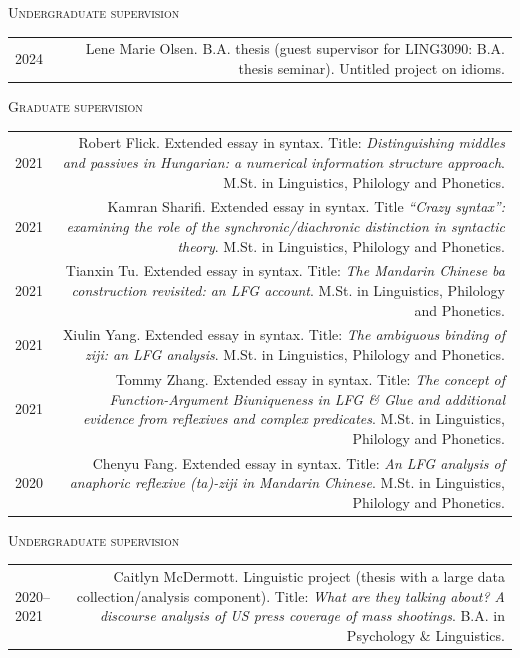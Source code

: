 \documentclass[11pt,a4paper]{article}
\makeatletter
\newlength{\rulelength}%
\newenvironment{cvsection}{%
  \setlength{\extrarowheight}{0.70ex}
  \begin{longtable}[l]{@{} L R @{}}
}{%
  \end{longtable}
}
\newcommand{\cvsubhead}[1]{\noindent\hspace*{\rulelength}\hspace*{9pt} \textsc{#1}\vspace*{0.25\baselineskip}}
\newcommand{\rulesubhead}[1]{\noindent{\color{headercolor}\rule[0.4ex]{\rulelength}{1pt}\hspace*{9pt} {#1}}\vspace*{0.25\baselineskip}}
\makeatother
\begin{document}
\cvsubhead{Undergraduate supervision}

\begin{cvsection}
  2024 & Lene Marie Olsen. B.A. thesis (guest supervisor for LING3090: B.A. thesis seminar). Untitled project on idioms.%
\end{cvsection}

\rulesubhead{University of Oxford}

\cvsubhead{Graduate supervision}

\begin{cvsection}
  2021 & Robert Flick. Extended essay in syntax. Title: \textit{Distinguishing
    middles and passives in Hungarian: a numerical information structure
    approach}. M.St. in Linguistics, Philology and Phonetics. \\

  2021 & Kamran Sharifi. Extended essay in syntax. Title \textit{``Crazy
    syntax'': examining the role of the synchronic/diachronic distinction in
    syntactic theory}. M.St. in Linguistics, Philology and Phonetics.\\

  2021 & Tianxin Tu. Extended essay in syntax. Title: \textit{The Mandarin
    Chinese \emph{ba} construction revisited: an LFG account}. M.St. in Linguistics, Philology and Phonetics.\\

  2021 & Xiulin Yang. Extended essay in syntax. Title: \textit{The ambiguous
    binding of \emph{ziji}: an LFG analysis}. M.St. in Linguistics, Philology and Phonetics.\\

  2021 & Tommy Zhang. Extended essay in syntax. Title: \textit{The concept of
    Function-Argument Biuniqueness in LFG \& Glue and additional evidence
    from reflexives and complex predicates}. M.St. in Linguistics, Philology and Phonetics.\\

  2020 & Chenyu Fang. Extended essay in syntax. Title: \textit{An LFG analysis
    of anaphoric reflexive \emph{(ta)-ziji} in Mandarin Chinese}. M.St. in
  Linguistics, Philology and Phonetics.
\end{cvsection}

\newpage
\cvsubhead{Undergraduate supervision}

\begin{cvsection}
  2020--2021 & Caitlyn McDermott. Linguistic project (thesis with a large data
  collection\slash analysis component). Title: \textit{What are they talking about? A discourse analysis of US press coverage of mass shootings}. B.A. in Psychology \& Linguistics.\\
\end{cvsection}
\end{document}
